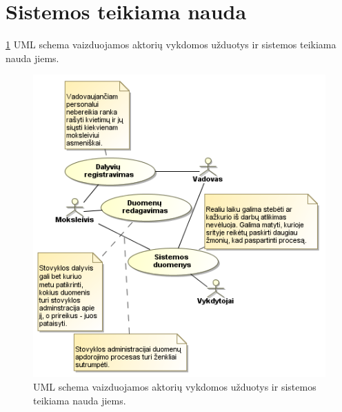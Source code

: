 \section{Sistemos teikiama nauda}

\ref{fig:uml_tasks2} UML schema vaizduojamos aktorių vykdomos užduotys 
ir sistemos teikiama nauda jiems.

\begin{figure}[h!]
  \begin{center}
    \includegraphics[scale=0.8]{images/sistemos_tiekiama_nauda.png}
  \end{center}
  \caption{UML schema vaizduojamos aktorių vykdomos užduotys ir sistemos 
    teikiama nauda jiems.}
  \label{fig:uml_tasks2}
\end{figure}
